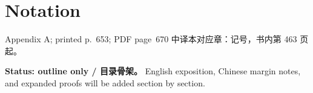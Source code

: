 \chapter{Notation}
\label{app:notation}

\PDESource
  {Appendix A; printed p.~653; PDF page~670}
  {中译本对应章：记号，书内第 463 页起。}

\noindent\textbf{Status: outline only / 目录骨架。}
English exposition, Chinese margin notes, and expanded proofs will be added section by section.







